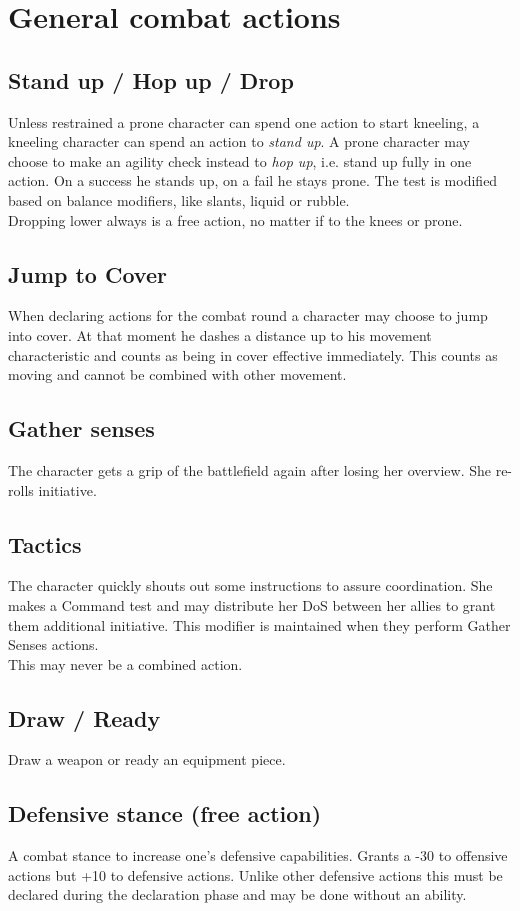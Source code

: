 \pagebreak
\section{General combat actions}
\subsection*{Stand up / Hop up / Drop}
Unless restrained a prone character can spend one action to start kneeling, a kneeling character can spend an action to \emph{stand up}. A prone character may choose to make an agility check instead to \emph{hop up}, i.e. stand up fully in one action. On a success he stands up, on a fail he stays prone. The test is modified based on balance modifiers, like slants, liquid or rubble.\\
Dropping lower always is a free action, no matter if to the knees or prone.
\subsection*{Jump to Cover}
When declaring actions for the combat round a character may choose to jump into cover. At that moment he dashes a distance up to his movement characteristic and counts as being in cover effective immediately. This counts as moving and cannot be combined with other movement.
\subsection*{Gather senses}
The character gets a grip of the battlefield again after losing her overview. She re-rolls initiative.
\subsection*{Tactics}
The character quickly shouts out some instructions to assure coordination. She makes a Command test and may distribute her DoS between her allies to grant them additional initiative. This modifier is maintained when they perform Gather Senses actions.\\
This may never be a combined action.
\subsection*{Draw / Ready}
Draw a weapon or ready an equipment piece.
\subsection*{Defensive stance (free action)}
A combat stance to increase one’s defensive capabilities. Grants a -30 to offensive actions but +10 to defensive actions. Unlike other defensive actions this must be declared during the declaration phase and may be done without an ability.
